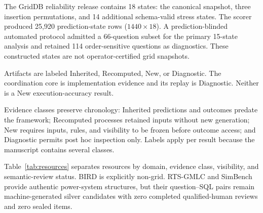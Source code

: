 \documentclass[applsci,article,submit,moreauthors]{Definitions/mdpi}
\begin{document}
The GridDB reliability release contains 18 states: the canonical snapshot, three insertion permutations, and 14 additional schema-valid stress states. The scorer produced 25,920 prediction-state rows ($1440\times18$). A prediction-blinded automated protocol admitted a 66-question subset for the primary 15-state analysis and retained 114 order-sensitive questions as diagnostics. These constructed states are not operator-certified grid snapshots.

Artifacts are labeled Inherited, Recomputed, New, or Diagnostic. The coordination core is implementation evidence and its replay is Diagnostic. Neither is a New execution-accuracy result.

Evidence classes preserve chronology: Inherited predictions and outcomes predate the framework; Recomputed processes retained inputs without new generation; New requires inputs, rules, and visibility to be frozen before outcome access; and Diagnostic permits post hoc inspection only. Labels apply per result because the manuscript contains several classes.

Table~\ref{tab:resources} separates resources by domain, evidence class, visibility, and semantic-review status. BIRD is explicitly non-grid. RTS-GMLC and SimBench provide authentic power-system structures, but their question--SQL pairs remain machine-generated silver candidates with zero completed qualified-human reviews and zero sealed items.

\begin{table}[htbp]
\caption{Data-resource scope and evidence status. Counts describe retained local artifacts; they are not interchangeable benchmark denominators.}
\label{tab:resources}
\centering
\small
\setlength{\tabcolsep}{3pt}
\end{table}
\end{document}
